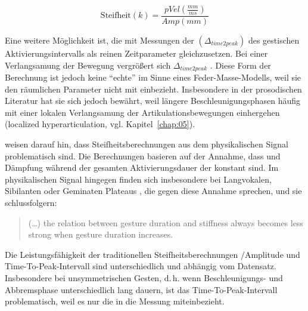 \begin{equation}
\label{eq:diff03}
\text{Steifheit}(k)=\frac{{pVel}\left(\frac{{mm}}{{ms}}\right)}{{Amp}\left({mm}\right)}
\end{equation}

Eine weitere Möglichkeit ist, die  mit Messungen der  $\left({\Delta}_{{time}2{peak}}\right)$ des gestischen Aktivierungsintervalls als reinen Zeitparameter gleichzusetzen.
Bei einer Verlangsamung der Bewegung vergrößert sich ${\Delta}_{{time}2{peak}}$ \citep[vgl.][]{Cho2002a, Cho2006, Byrd1998}. Diese Form der Berechnung ist jedoch keine \enquote{echte}  im Sinne eines Feder-Masse-Modells, weil sie den räumlichen Parameter nicht mit einbezieht. Insbesondere in der prosodischen Literatur hat sie sich jedoch bewährt, weil längere Beschleunigungsphasen häufig mit einer lokalen Verlangsamung der Artikulationsbewegungen einhergehen (localized hyperarticulation, vgl. Kapitel~\ref{chap:05}).

\citet{Fuchs2011} weisen darauf hin, dass Steifheitsberechnungen aus dem physikalischen Signal problematisch sind. Die Berechnungen basieren auf der Annahme, dass  und Dämpfung während der gesamten Aktivierungsdauer der  konstant sind. Im physikalischen Signal hingegen finden sich insbesondere bei Langvokalen, Sibilanten oder Geminaten Plateaus \citep[][1068]{Fuchs2011}, die gegen diese Annahme sprechen, und sie schlussfolgern:

\begin{quote}
	(\dots{}) the relation between gesture duration and stiffness always becomes less strong when gesture duration increases. \citep[][1074]{Fuchs2011}
\end{quote}

Die Leistungsfähigkeit der traditionellen Steifheitsberechnungen /Amplitude \citep{Munhall1985} und Time-To-Peak-Intervall \citep{Cho2002a, Cho2006, Byrd1998} sind unterschiedlich und abhängig vom Datensatz. Insbesondere bei unsymmetrischen Gesten, d.\,h. wenn Beschleunigungs- und Abbremsphase unterschiedlich lang dauern, ist das Time-To-Peak-Intervall problematisch, weil es nur die  in die Messung miteinbezieht.


